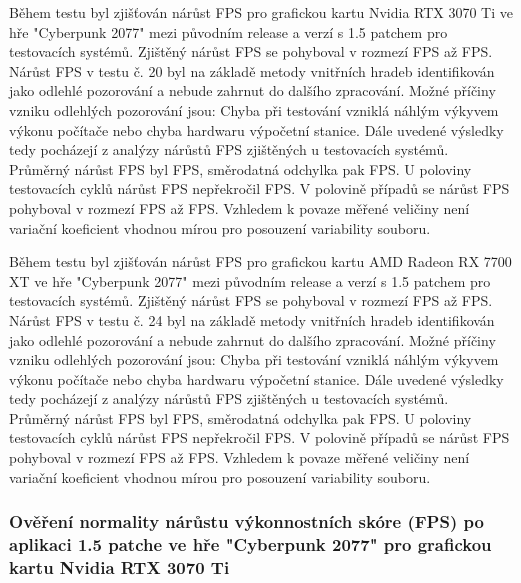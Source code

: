 Během testu byl zjišťován nárůst FPS pro grafickou kartu Nvidia RTX 3070 Ti ve hře "Cyberpunk 2077" mezi původním release a verzí s 1.5 patchem
pro  testovacích systémů. Zjištěný nárůst FPS se pohyboval v rozmezí  FPS
až  FPS. Nárůst FPS v testu č. 20 byl na základě metody vnitřních hradeb identifikován jako odlehlé pozorování
a nebude zahrnut do dalšího zpracování. Možné příčiny vzniku odlehlých pozorování jsou: Chyba při testování vzniklá náhlým výkyvem výkonu počítače
nebo chyba hardwaru výpočetní stanice. Dále uvedené výsledky tedy pocházejí z analýzy nárůstů FPS zjištěných u 
testovacích systémů. Průměrný nárůst FPS byl  FPS, směrodatná odchylka pak  FPS\@.
U poloviny testovacích cyklů nárůst FPS nepřekročil  FPS. V polovině případů se nárůst FPS pohyboval v
rozmezí  FPS až  FPS. Vzhledem k povaze měřené veličiny není variační koeficient vhodnou mírou
pro posouzení variability souboru.

\vspace{1em}
\noindent

Během testu byl zjišťován nárůst FPS pro grafickou kartu AMD Radeon RX 7700 XT ve hře "Cyberpunk 2077" mezi původním release a verzí s 1.5 patchem
pro  testovacích systémů. Zjištěný nárůst FPS se pohyboval v rozmezí  FPS
až  FPS. Nárůst FPS v testu č. 24 byl na základě metody vnitřních hradeb identifikován jako odlehlé pozorování
a nebude zahrnut do dalšího zpracování. Možné příčiny vzniku odlehlých pozorování jsou: Chyba při testování vzniklá náhlým výkyvem výkonu počítače
nebo chyba hardwaru výpočetní stanice. Dále uvedené výsledky tedy pocházejí z analýzy nárůstů FPS zjištěných u 
testovacích systémů. Průměrný nárůst FPS byl  FPS, směrodatná odchylka pak  FPS\@.
U poloviny testovacích cyklů nárůst FPS nepřekročil  FPS. V polovině případů se nárůst FPS pohyboval v
rozmezí  FPS až  FPS. Vzhledem k povaze měřené veličiny není variační koeficient vhodnou mírou
pro posouzení variability souboru.

\subsubsection*{Ověření normality nárůstu výkonnostních skóre (FPS) po aplikaci 1.5 patche ve hře "Cyberpunk 2077" pro grafickou kartu Nvidia RTX 3070 Ti}

